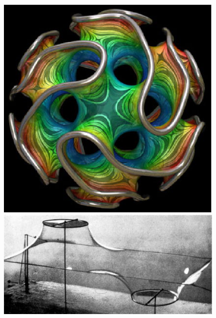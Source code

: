 \documentclass{beamer}
\begin{document}
\begin{frame}
\begin{figure}[h!]
  \begin{minipage}[b]{0.40\linewidth}
    \centering \includegraphics[scale=0.3]{savongyroid.eps}
 \end{minipage}
\begin{minipage}[b]{0.48\linewidth}   
 \centering \includegraphics[scale=0.23]{savonriemann.eps}
\end{minipage}
\end{figure}
\end{frame}
\end{document}
